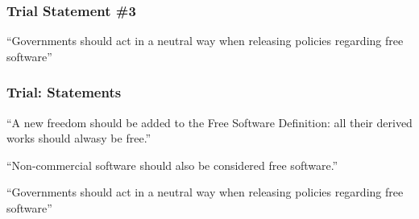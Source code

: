 \begin{frame}
\frametitle{Trial Statement \#3}

\begin{center}
\begin{LARGE}
``Governments should act in a neutral way when releasing policies regarding
free software''
\end{LARGE}
\end{center}

\end{frame}


\begin{frame}
\frametitle{Trial: Statements}

\begin{center}
\begin{LARGE}
``A new freedom should be added to the Free Software Definition:
all their derived works should alwasy be free.''
\end{LARGE}
\end{center}
\begin{center}
\begin{LARGE}
``Non-commercial software should also be considered free software.''
\end{LARGE}
\end{center}

\begin{center}
\begin{LARGE}
``Governments should act in a neutral way when releasing policies regarding
free software''
\end{LARGE}
\end{center}

\end{frame}


